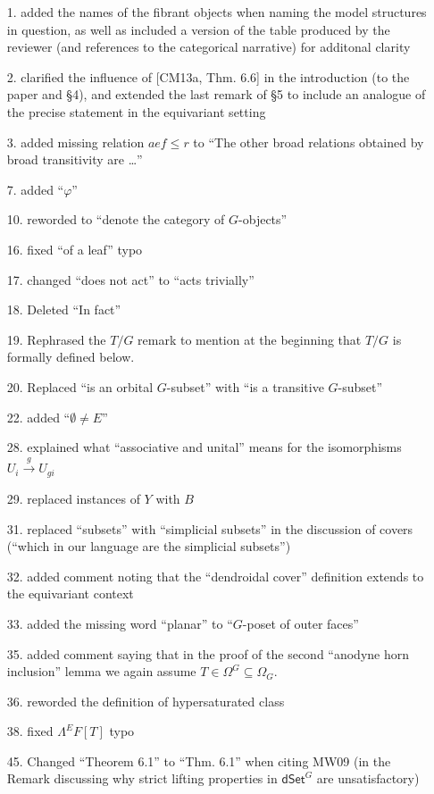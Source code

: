 \documentclass{article}
\begin{document}
\begin{itemize}
\item[1.] added the names of the fibrant objects when naming the model structures in question, as well as included a version of the table produced by the reviewer (and references to the categorical narrative) for additonal clarity
\item[2.] clarified the influence of [CM13a, Thm. 6.6] in the introduction (to the paper and \S 4), and extended the last remark of \S 5 to include an analogue of the precise statement in the equivariant setting
\item[3.] added missing relation $aef \leq r$ to ``The other broad relations obtained by broad transitivity are \dots''
\item[7.] added ``$\varphi$''
\item[10.] reworded to ``denote the category of $G$-objects''
\item[16.] fixed ``of a leaf'' typo
\item[17.] changed ``does not act'' to ``acts trivially''
\item[18.] Deleted ``In fact''
\item[19.] Rephrased the $T/G$ remark to mention at the beginning that $T/G$ is formally defined below.
\item[20.] Replaced ``is an orbital $G$-subset'' with ``is a transitive $G$-subset''
\item[22.] added ``$\emptyset \neq E$''
\item[28.] explained what ``associative and unital'' means for the isomorphisms $U_i \xrightarrow{g} U_{gi}$
\item[29.] replaced instances of $Y$ with $B$
\item[31.] replaced ``subsets'' with ``simplicial subsets'' in the discussion of covers (``which in our language are the simplicial subsets'')
\item[32.] added comment noting that the ``dendroidal cover'' definition extends to the equivariant context
\item[33.] added the missing word ``planar'' to ``$G$-poset of outer faces''
\item[35.] added comment saying that in the proof of the second ``anodyne horn inclusion'' lemma we again assume $T \in \Omega^G \subseteq \Omega_G$.
\item[36.] reworded the definition of hypersaturated class
\item[38.] fixed $\Lambda^EF[T]$ typo
\item[45.] Changed ``Theorem 6.1'' to ``Thm. 6.1'' when citing MW09 (in the Remark discussing why strict lifting properties in $\mathsf{dSet}^G$ are unsatisfactory)

\end{itemize}
\end{document}
